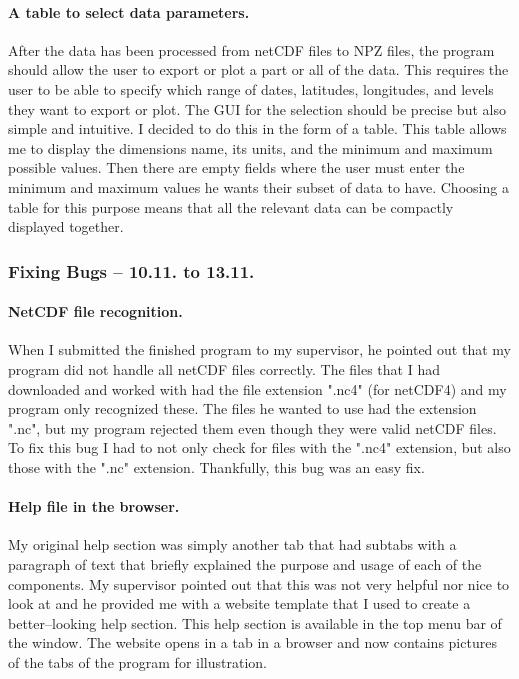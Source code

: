 \documentclass[../00_main.tex]{subfiles}
\begin{document}
\paragraph{A table to select data parameters.} 

After the data has been processed from netCDF files to NPZ files, the program 
should allow the user to export or plot a part or all of the data. This 
requires the user to be able to specify which range of dates, latitudes, 
longitudes, and levels they want to export or plot. The GUI for the selection 
should be precise but also simple and intuitive. I decided to do this in the 
form of a table. This table allows me to display the dimensions name, its 
units, and the minimum and maximum possible values. Then there are empty fields 
where the user must enter the minimum and maximum values he wants their subset 
of data to have. Choosing a table for this purpose means that all the relevant 
data can be compactly displayed together. 

\subsubsection{Fixing Bugs -- 10.11. to 13.11.}

\paragraph{NetCDF file recognition.} 

When I submitted the finished program to my supervisor, he pointed out that my 
program did not handle all netCDF files correctly. The files that I had 
downloaded and worked with had the file extension ".nc4" (for netCDF4) and my 
program only recognized these. The files he wanted to use had the extension 
".nc", but my program rejected them even though they were valid netCDF files. 
To fix this bug I had to not only check for files with the ".nc4" extension, 
but also those with the ".nc" extension. Thankfully, this bug was an easy fix.

\paragraph{Help file in the browser.} 

My original help section was simply another tab that had subtabs with a 
paragraph of text that briefly explained the purpose and usage of each of the 
components. My supervisor pointed out that this was not very helpful nor nice 
to look at and he provided me with a website template that I used to create a 
better--looking help section. This help section is available in the top menu 
bar of the window. The website opens in a tab in a browser and now contains 
pictures of the tabs of the program for illustration.
\end{document}
